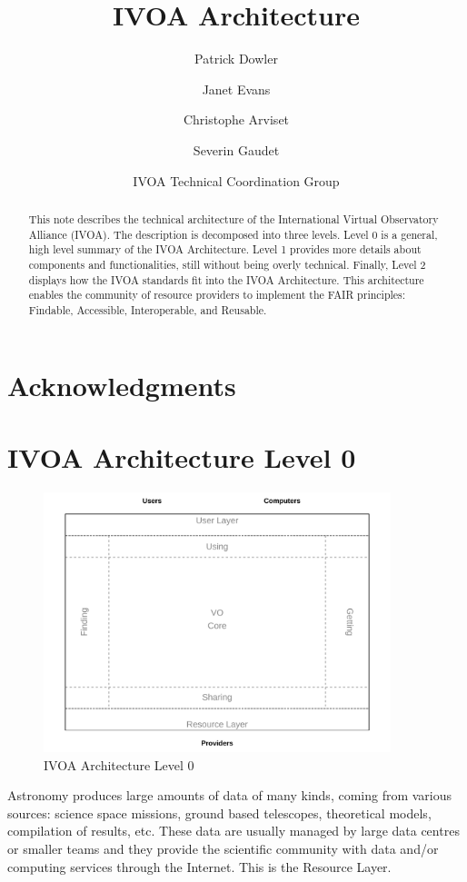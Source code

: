 \documentclass[11pt,a4paper]{ivoa}
\title{IVOA Architecture}
\author{Patrick Dowler}
\author{Janet Evans}
\author{Christophe Arviset}
\author{Severin Gaudet}
\author{IVOA Technical Coordination Group}
\begin{document}
\begin{abstract}
This note describes the technical architecture of the International Virtual Observatory Alliance 
(IVOA). The description is decomposed 
into three levels. Level 0 is a general, high level summary of the IVOA Architecture. 
Level 1 provides more details about components and functionalities, still without 
being overly technical. Finally, Level 2 displays how the IVOA standards fit into 
the IVOA Architecture. This architecture enables the community of resource providers to
implement the FAIR principles: Findable, Accessible, Interoperable, and Reusable.
\end{abstract}

\section*{Acknowledgments}

\section{IVOA Architecture Level 0}

\begin{figure}[h]
\centering
\includegraphics[width=0.9\textwidth]{archdiag0.pdf}
\caption{IVOA Architecture Level 0}
\label{fig:architecture0}
\end{figure}

Astronomy produces large amounts of data of many kinds, coming from various sources: 
science  space missions, ground based telescopes, theoretical models, compilation of 
results, etc.  These data are usually managed by large data centres or smaller teams
and they provide  the scientific community with data and/or computing services 
through the Internet. This is the Resource Layer. 
\end{document}
